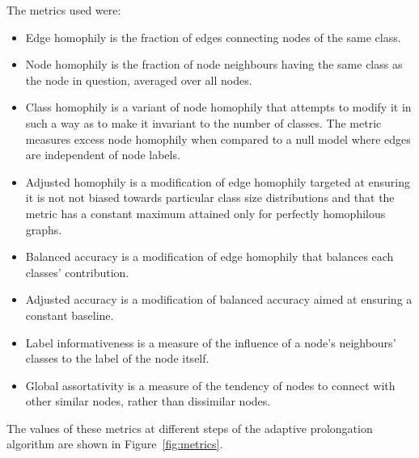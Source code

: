 The metrics used were:
\begin{itemize}
  \item Edge homophily \cite{zhu_beyond_2020} is the fraction of edges connecting nodes of the same class.
  \item Node homophily \cite{pei_geom-gcn_2020} is the fraction of node neighbours having the same class as the node in question, averaged over all nodes.
  \item Class homophily \cite{lim_large_2021} is a variant of node homophily that attempts to modify it in such a way as to make it invariant to the number of classes. The metric measures excess node homophily when compared to a null model where edges are independent of node labels.
  \item Adjusted homophily \cite{platonov_characterizing_2022} is a modification of edge homophily targeted at ensuring it is not not biased towards particular class size distributions and that the metric has a constant maximum attained only for perfectly homophilous graphs.
  \item Balanced accuracy \cite{platonov_characterizing_2022} is a modification of edge homophily that balances each classes' contribution.
  \item Adjusted accuracy \cite{platonov_characterizing_2022} is a modification of balanced accuracy aimed at ensuring a constant baseline.
  \item Label informativeness \cite{platonov_characterizing_2022} is a measure of the influence of a node's neighbours' classes to the label of the node itself.
  \item Global assortativity \cite{newman_mixing_2003} is a measure of the tendency of nodes to connect with other similar nodes, rather than dissimilar nodes.
\end{itemize}

The values of these metrics at different steps of the adaptive prolongation algorithm are shown in Figure~\ref{fig:metrics}.

